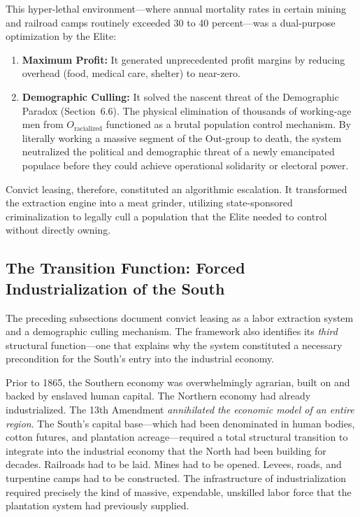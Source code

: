 This hyper-lethal environment---where annual mortality rates in certain mining and railroad camps routinely exceeded 30 to 40 percent---was a dual-purpose optimization by the Elite:

\begin{enumerate}
    \item \textbf{Maximum Profit:} It generated unprecedented profit margins by reducing overhead (food, medical care, shelter) to near-zero.

    \item \textbf{Demographic Culling:} It solved the nascent threat of the Demographic Paradox (Section~6.6). The physical elimination of thousands of working-age men from $O_{\text{racialized}}$ functioned as a brutal population control mechanism. By literally working a massive segment of the Out-group to death, the system neutralized the political and demographic threat of a newly emancipated populace before they could achieve operational solidarity or electoral power.
\end{enumerate}

Convict leasing, therefore, constituted an algorithmic escalation. It transformed the extraction engine into a meat grinder, utilizing state-sponsored criminalization to legally cull a population that the Elite needed to control without directly owning.

\subsection{The Transition Function: Forced Industrialization of the South}

The preceding subsections document convict leasing as a labor extraction system and a demographic culling mechanism. The framework also identifies its \textit{third} structural function---one that explains why the system constituted a necessary precondition for the South's entry into the industrial economy.

Prior to 1865, the Southern economy was overwhelmingly agrarian, built on and backed by enslaved human capital. The Northern economy had already industrialized. The 13th Amendment \textit{annihilated the economic model of an entire region}. The South's capital base---which had been denominated in human bodies, cotton futures, and plantation acreage---required a total structural transition to integrate into the industrial economy that the North had been building for decades. Railroads had to be laid. Mines had to be opened. Levees, roads, and turpentine camps had to be constructed. The infrastructure of industrialization required precisely the kind of massive, expendable, unskilled labor force that the plantation system had previously supplied.

